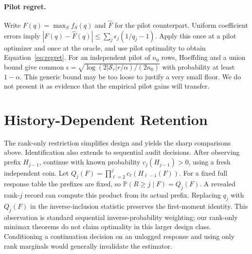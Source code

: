 \documentclass[12pt]{clear2027}
\newcommand{\Prb}{\mathbb{P}}
\newcommand{\calS}{\mathcal{S}}
\begin{document}
\paragraph{Pilot regret.}
Write $F(q)=\max_S f_S(q)$ and $\widehat F$ for the pilot counterpart. Uniform coefficient errors imply $|F(q)-\widehat F(q)|\le\sum_j\epsilon_j(1/q_j-1)$. Apply this once at a pilot optimizer and once at the oracle, and use pilot optimality to obtain Equation~\eqref{eq:regret}. For an independent pilot of $n_0$ rows, Hoeffding and a union bound give common
$\epsilon=\sqrt{\log(2|\calS_r|r/\alpha)/(2n_0)}$
with probability at least $1-\alpha$. This generic bound may be too loose to justify a very small floor. We do not present it as evidence that the empirical pilot gains will transfer.

\section{History-Dependent Retention}\label{app:adaptive}
The rank-only restriction simplifies design and yields the sharp comparisons above. Identification also extends to sequential audit decisions. After observing prefix $H_{j-1}$, continue with known probability $c_j(H_{j-1})>0$, using a fresh independent coin. Let
$Q_j(F)=\prod_{\ell=2}^j c_\ell(H_{\ell-1}(F))$.
For a fixed full response table the prefixes are fixed, so $\Prb(R\ge j\mid F)=Q_j(F)$. A revealed rank-$j$ record can compute this product from its actual prefix. Replacing $q_j$ with $Q_j(F)$ in the inverse-inclusion statistic preserves the first-moment identity. This observation is standard sequential inverse-probability weighting; our rank-only minimax theorems do not claim optimality in this larger design class. Conditioning a continuation decision on an unlogged response and using only rank marginals would generally invalidate the estimator.
\end{document}
